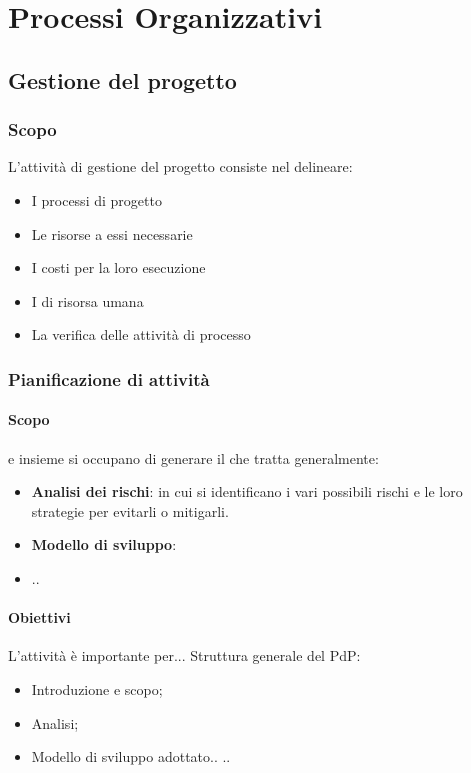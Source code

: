 \section{Processi Organizzativi}


    \subsection{Gestione del progetto}

	    \subsubsection{Scopo}
	    L'attività di gestione del progetto consiste nel delineare:
	    \begin{itemize}
	    	\item I processi di progetto
	    	\item Le risorse a essi necessarie 
	    	\item I costi per la loro esecuzione
	    	\item I  di risorsa umana
	    	\item La verifica delle attività di processo
	    \end{itemize}


		\subsubsection{Pianificazione di attività}

			\paragraph{Scopo}
			\Res e \Amm insieme si occupano di generare il \PdPv che tratta generalmente:
			\begin{itemize}
				\item \textbf{Analisi dei rischi}: in cui si identificano i vari possibili rischi e le loro strategie per evitarli o mitigarli.   
				\item \textbf{Modello di sviluppo}: 
				\item 
				..
			\end{itemize}

			\paragraph{Obiettivi}
			L'attività è importante per...
			Struttura generale del PdP:
			\begin{itemize}
				\item Introduzione e scopo;
				\item Analisi;
				\item Modello di sviluppo adottato..
				..
			\end{itemize}

